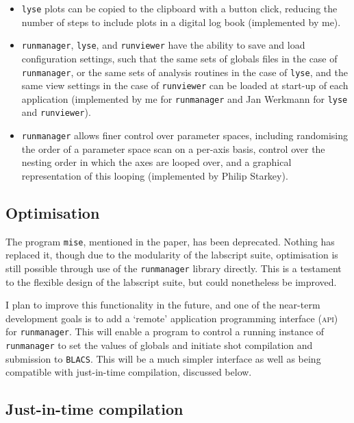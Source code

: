 \begin{itemize}
    \item \texttt{lyse} plots can be copied to the clipboard with a button click, reducing the number of steps to include plots in a digital log book (implemented by me).
    
    \item \texttt{runmanager}, \texttt{lyse}, and \texttt{runviewer} have the ability to save and load configuration settings, such that the same sets of globals files in the case of \texttt{runmanager}, or the same sets of analysis routines in the case of \texttt{lyse}, and the same view settings in the case of \texttt{runviewer} can be loaded at start-up of each application (implemented by me for \texttt{runmanager} and Jan Werkmann for \texttt{lyse} and \texttt{runviewer}).
    
    \item \texttt{runmanager} allows finer control over parameter spaces, including randomising the order of a parameter space scan on a per-axis basis, control over the nesting order in which the axes are looped over, and a graphical representation of this looping (implemented by Philip Starkey).
\end{itemize}

\subsection{Optimisation}

The program \texttt{mise}, mentioned in the paper, has been deprecated. Nothing has replaced it, though due to the modularity of the labscript suite, optimisation is still possible through use of the \texttt{runmanager} library directly. This is a testament to the flexible design of the labscript suite, but could nonetheless be improved.

I plan to improve this functionality in the future, and one of the near-term development goals is to add a `remote' application programming interface (\textsc{api}) for \texttt{runmanager}. This will enable a program to control a running instance of \texttt{runmanager} to set the values of globals and initiate shot compilation and submission to \texttt{BLACS}. This will be a much simpler interface as well as being compatible with just-in-time compilation, discussed below.

\subsection{Just-in-time compilation}\label{sec:jit}

